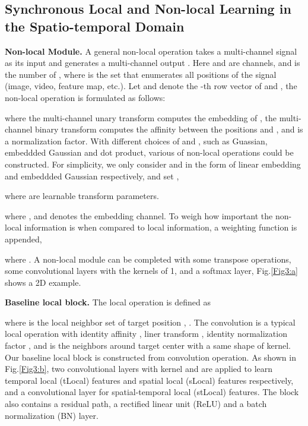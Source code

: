 \documentclass{article}
\begin{document}
\subsection{Synchronous Local and Non-local Learning in the Spatio-temporal Domain}
\textbf{Non-local Module.}
A general non-local operation takes a multi-channel signal {\myfont} as its input and generates a multi-channel output {\myfont}. Here {\myfont} and  {\myfont} are channels, and {\myfont} is the number of {\myfont}, where {\myfont} is the set that enumerates all positions of the signal (image, video, feature map, etc.). Let {\myfont} and {\myfont} denote the -th row vector of  {\myfont} and {\myfont}, the non-local operation is formulated as follows:
{\myfont
	
}where the multi-channel unary transform {\myfont} computes the embedding of , the multi-channel binary transform {\myfont} computes the affinity between the positions  and , and {\myfont} is a normalization factor. With different choices of  and , such as Guassian, embeddded Gaussian and dot product, various of non-local operations could be constructed. For simplicity, we only consider  and  in the form of linear embedding and embeddded Gaussian respectively, and set {\myfont}, \ie~
{\myfont
	
}where {\myfont} are learnable transform parameters.
{\myfont
	
}where {\myfont}, and  denotes the embedding channel. To weigh how important the non-local information is when compared to local information, a weighting function is appended,
\ie~
{\myfont
	
}where {\myfont}. A non-local module can be completed with some transpose operations, some convolutional layers with the kernels of 1, and a softmax layer, Fig.\ref{Fig3:a} shows a 2D example.

\textbf{Baseline local block.}
The local operation is defined as
{\myfont
	
}where {\myfont} is the local neighbor set of target position , {\myfont}.
The convolution is a typical local operation with identity affinity {\myfont}, liner transform {\myfont}, identity normalization factor {\myfont}, and {\myfont} is the neighbors around target center  with a same shape of kernel. Our baseline local block is constructed from convolution operation. As shown in Fig.\ref{Fig3:b}, two convolutional layers with kernel {\myfont} and {\myfont} are applied to learn temporal local (tLocal) features and spatial local (sLocal) features respectively, and a {\myfont} convolutional layer for spatial-temporal local (stLocal) features. The block also contains a residual path, a rectified linear unit (ReLU) and a batch normalization (BN) layer.
\end{document}
